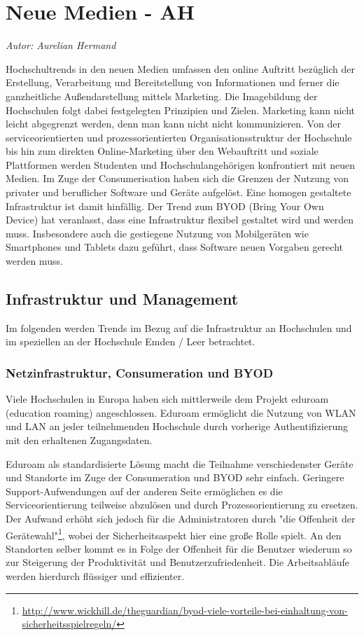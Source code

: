 \section{Neue Medien - AH}
\textit{Autor: Aurelian Hermand}


Hochschultrends in den neuen Medien umfassen den online Auftritt bezüglich der Erstellung, Verarbeitung und Bereitstellung von Informationen und ferner die ganzheitliche Außendarstellung mittels Marketing. Die Imagebildung der Hochschulen folgt dabei festgelegten Prinzipien und Zielen. Marketing kann nicht leicht abgegrenzt werden, denn man kann nicht nicht kommunizieren. Von der serviceorientierten und prozessorientierten Organisationsstruktur der Hochschule bis hin zum direkten Online-Marketing über den Webauftritt und soziale Plattformen werden Studenten und Hochschulangehörigen konfrontiert mit neuen Medien. Im Zuge der Consumerisation haben sich die Grenzen der Nutzung von privater und beruflicher Software und Geräte aufgelöst. Eine homogen gestaltete Infrastruktur ist damit hinfällig. Der Trend zum BYOD (Bring Your Own Device) hat veranlasst, dass eine Infrastruktur flexibel gestaltet wird und werden muss. Insbesondere auch die gestiegene Nutzung von Mobilgeräten wie Smartphones und Tablets dazu geführt, dass Software neuen Vorgaben gerecht werden muss.


\subsection{Infrastruktur und Management}
Im folgenden werden Trends im Bezug auf die Infrastruktur an Hochschulen und im speziellen an der Hochschule Emden / Leer betrachtet. 

\subsubsection{Netzinfrastruktur, Consumeration und BYOD}
\label{netzinfrastruktur_consumeration_und_byod}
Viele Hochschulen in Europa haben sich mittlerweile dem Projekt eduroam (education roaming) angeschlossen. Eduroam ermöglicht die Nutzung von WLAN und LAN an jeder teilnehmenden Hochschule durch vorherige Authentifizierung mit den erhaltenen Zugangsdaten.

Eduroam als standardisierte Lösung macht die Teilnahme verschiedenster Geräte und Standorte im Zuge der Consumeration und BYOD sehr einfach. Geringere Support-Aufwendungen auf der anderen Seite ermöglichen es die Serviceorientierung teilweise abzulösen und durch Prozessorientierung zu ersetzen. Der Aufwand erhöht sich jedoch für die Administratoren durch "die Offenheit der Gerätewahl"\footnote{\url{http://www.wickhill.de/theguardian/byod-viele-vorteile-bei-einhaltung-von-sicherheitsspielregeln/}}, wobei der Sicherheitsaspekt hier eine große Rolle spielt. An den Standorten selber kommt es in Folge der Offenheit für die Benutzer wiederum so zur Steigerung der Produktivität und Benutzerzufriedenheit. Die Arbeitsabläufe werden hierdurch flüssiger und effizienter.

